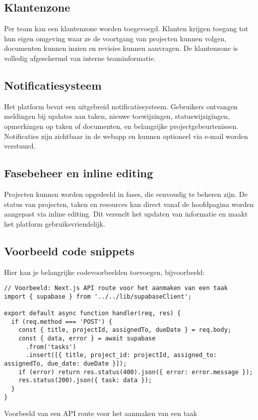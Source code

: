 \subsection{Klantenzone}
Per team kan een klantenzone worden toegevoegd. Klanten krijgen toegang tot hun eigen omgeving waar ze de voortgang van projecten kunnen volgen, documenten kunnen inzien en revisies kunnen aanvragen. De klantenzone is volledig afgeschermd van interne teaminformatie.

\subsection{Notificatiesysteem}
Het platform bevat een uitgebreid notificatiesysteem. Gebruikers ontvangen meldingen bij updates aan taken, nieuwe toewijzingen, statuswijzigingen, opmerkingen op taken of documenten, en belangrijke projectgebeurtenissen. Notificaties zijn zichtbaar in de webapp en kunnen optioneel via e-mail worden verstuurd.

\subsection{Fasebeheer en inline editing}
Projecten kunnen worden opgedeeld in fases, die eenvoudig te beheren zijn. De status van projecten, taken en resources kan direct vanaf de hoofdpagina worden aangepast via inline editing. Dit versnelt het updaten van informatie en maakt het platform gebruiksvriendelijk.

\subsection{Voorbeeld code snippets}
Hier kan je belangrijke codevoorbeelden toevoegen, bijvoorbeeld:
\begin{listing}[H]
\begin{verbatim}
// Voorbeeld: Next.js API route voor het aanmaken van een taak
import { supabase } from '../../lib/supabaseClient';

export default async function handler(req, res) {
  if (req.method === 'POST') {
    const { title, projectId, assignedTo, dueDate } = req.body;
    const { data, error } = await supabase
      .from('tasks')
      .insert([{ title, project_id: projectId, assigned_to: assignedTo, due_date: dueDate }]);
    if (error) return res.status(400).json({ error: error.message });
    res.status(200).json({ task: data });
  }
}
\end{verbatim}
\caption{Voorbeeld van een API route voor het aanmaken van een taak}
\end{listing}

